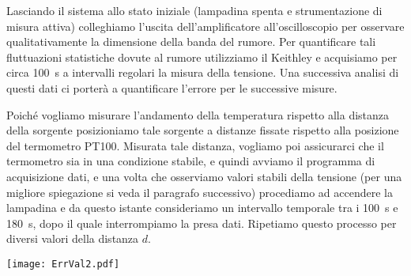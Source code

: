 \documentclass[
    rmp,
    reprint, 
    superscriptaddress, 
    altaffilletter, 
    amsmath, 
    amssymb,
    a4paper]{revtex4-2}
\begin{document}
Lasciando il sistema allo stato iniziale (lampadina spenta e strumentazione di misura attiva) colleghiamo l'uscita dell'amplificatore all'oscilloscopio per osservare qualitativamente la dimensione della banda del rumore. 
Per quantificare tali fluttuazioni statistiche dovute al rumore utilizziamo il Keithley e acquisiamo per circa \SI{100}{\second} a intervalli regolari la misura della tensione. Una successiva analisi di questi dati ci porterà a quantificare l'errore per le successive misure.

Poiché vogliamo misurare l'andamento della temperatura rispetto alla distanza della sorgente posizioniamo tale sorgente a distanze fissate rispetto alla posizione del termometro PT100. Misurata tale distanza, vogliamo poi assicurarci che il termometro sia in una condizione stabile, e quindi avviamo il programma di acquisizione dati, e una volta che osserviamo valori stabili della tensione (per una migliore spiegazione si veda il paragrafo successivo) procediamo ad accendere la lampadina e da questo istante consideriamo un intervallo temporale tra i \SI{100}{\second} e \SI{180}{\second}, dopo il quale interrompiamo la presa dati. Ripetiamo questo processo per diversi  valori della distanza $d$.

\begin{figure*}
    \texttt{[image: ErrVal2.pdf]}
    \caption{Per la valutazione dell'errore abbiamo raccolto alcuni dati lasciando la strumentazione in tensione e la sorgente spenta. Questi dati, nel grafico in alto al centro (Dati pre-analisi V(t)) mostrano un comportamento riconducibile ad un segnale sinusoidale a bassa frequenza, e la relativa distribuzione, nell'istogramma (Dati pre-analisi), non è infatti riconducibile ad una curva gaussiana come atteso per una distribuzione di probabilità legata all'errore. In basso al centro (Dati senza componente V(t)) invece troviamo i dati trattati sottraendo la componente periodica sinusoidale, mostra un comportamento che non è imputabile alla presenza di altri componenti periodiche. Infatti la relativa distribuzione è ben più simile ad una distribuzione gaussiana, come osserviamo a sinistra in rosso. Questa componente però non può essere giustificata in nessun modo fisicamente, quindi ci preoccupiamo di dividere il segnale in batch di circa 50 punti di acquisizione l'uno e consideriamo quelli dove la curva non sembra oscillare periodicamente. Realizziamo dai batch 1, 4 e 5 quindi gli istogrammi (in alto a destra) e sommando i dati relativi a questi tre batch, osserviamo in un istogramma complessivo un comportamento che può essere gaussiano. Da quest'ultimo (in basso a destra) troviamo quindi il valore della deviazione standard ($1\sigma$) di \SI{1}{\milli\volt}.}
    \label{fig:errore}
\end{figure*}
\end{document}
